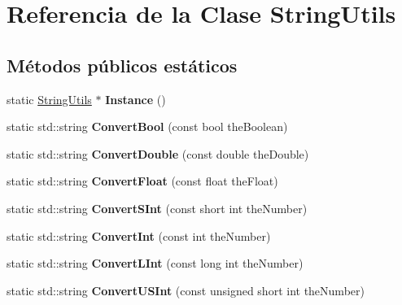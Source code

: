 \hypertarget{classStringUtils}{\section{Referencia de la Clase String\-Utils}
\label{classStringUtils}
}
\subsection*{Métodos públicos estáticos}
\begin{DoxyCompactItemize}
\item 
\hypertarget{classStringUtils_ae3a176c3a0e659c20f028b8287c01c55}{static \hyperlink{classStringUtils}{String\-Utils} $\ast$ {\bfseries Instance} ()}\label{classStringUtils_ae3a176c3a0e659c20f028b8287c01c55}

\item 
\hypertarget{classStringUtils_a6457ea4bd1f0b815c21358abad33d8f5}{static std\-::string {\bfseries Convert\-Bool} (const bool the\-Boolean)}\label{classStringUtils_a6457ea4bd1f0b815c21358abad33d8f5}

\item 
\hypertarget{classStringUtils_af49b24b3ccda9f7594a4c82a534faeb7}{static std\-::string {\bfseries Convert\-Double} (const double the\-Double)}\label{classStringUtils_af49b24b3ccda9f7594a4c82a534faeb7}

\item 
\hypertarget{classStringUtils_a09cf1af81172e632c5b77e3e369af551}{static std\-::string {\bfseries Convert\-Float} (const float the\-Float)}\label{classStringUtils_a09cf1af81172e632c5b77e3e369af551}

\item 
\hypertarget{classStringUtils_acbe48923ece17963f7e405ff8fe8a222}{static std\-::string {\bfseries Convert\-S\-Int} (const short int the\-Number)}\label{classStringUtils_acbe48923ece17963f7e405ff8fe8a222}

\item 
\hypertarget{classStringUtils_a6341cf3fb9a6b0f2cf885674f507e4bd}{static std\-::string {\bfseries Convert\-Int} (const int the\-Number)}\label{classStringUtils_a6341cf3fb9a6b0f2cf885674f507e4bd}

\item 
\hypertarget{classStringUtils_ae77b09c049b7185d7b42e81fcfde8f85}{static std\-::string {\bfseries Convert\-L\-Int} (const long int the\-Number)}\label{classStringUtils_ae77b09c049b7185d7b42e81fcfde8f85}

\item 
\hypertarget{classStringUtils_a655f332e3216417deb4963956c15a002}{static std\-::string {\bfseries Convert\-U\-S\-Int} (const unsigned short int the\-Number)}\label{classStringUtils_a655f332e3216417deb4963956c15a002}


\end{DoxyCompactItemize}
